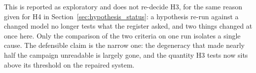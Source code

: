 This is reported as exploratory and does not re-decide H3, for the same reason given for H4 in Section~\ref{sec:hypothesis_status}: a hypothesis re-run against a changed model no longer tests what the register asked, and two things changed at once here. Only the comparison of the two criteria on one run isolates a single cause. The defensible claim is the narrow one: the degeneracy that made nearly half the campaign unreadable is largely gone, and the quantity H3 tests now sits above its threshold on the repaired system.


